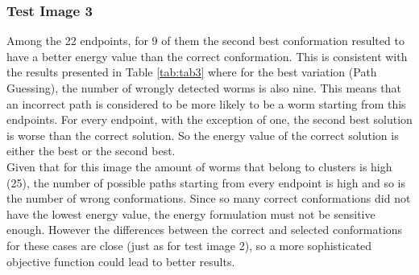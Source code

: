 \subsubsection*{Test Image 3}

Among the 22 endpoints, for 9
of them the second best conformation resulted to have a better energy value
than the correct conformation. This is consistent with the results presented
in Table \ref{tab:tab3} where for the best variation (Path Guessing), the
number of wrongly detected worms is also nine. This means that an incorrect 
path is considered to be more likely to be a worm starting from this
endpoints. For every endpoint, with the exception of one, the second best 
solution is worse than the correct solution. So the energy value of the 
correct solution is either the best or the second best.\\

Given that for this image the amount of worms that belong to clusters
is high (25), the number of possible paths starting
from every endpoint is high and so is the number of wrong conformations.
Since so many correct conformations did not have the lowest energy value,
the energy formulation must not be sensitive enough. However
the differences between the correct and selected conformations for
these cases are close (just as for test image 2), so a more sophisticated objective function could lead
to better results.\\



